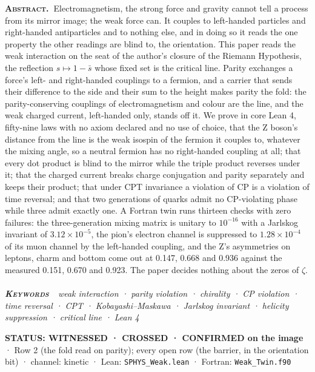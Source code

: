 \documentclass[10pt]{article}
\renewenvironment{quote}{\par\smallskip\noindent\small\color{deep}}{\par\smallskip}
\begin{document}
{\small\noindent\textbf{\scshape\color{deep}Abstract.\ }Electromagnetism,
the strong force and gravity cannot tell a process from its mirror
image; the weak force can. It couples to left-handed particles and
right-handed antiparticles and to nothing else, and in doing so it reads
the one property the other readings are blind to, the orientation. This
paper reads the weak interaction on the seat of the author's closure of
the Riemann Hypothesis, the reflection \(s\mapsto1-\bar s\) whose fixed
set is the critical line. Parity exchanges a force's left- and
right-handed couplings to a fermion, and a carrier that sends their
difference to the side and their sum to the height makes parity the
fold: the parity-conserving couplings of electromagnetism and colour are
the line, and the weak charged current, left-handed only, stands off it.
We prove in core Lean 4, fifty-nine laws with no axiom declared and no
use of choice, that the Z boson's distance from the line is the weak
isospin of the fermion it couples to, whatever the mixing angle, so a
neutral fermion has no right-handed coupling at all; that every dot
product is blind to the mirror while the triple product reverses under
it; that the charged current breaks charge conjugation and parity
separately and keeps their product; that under CPT invariance a
violation of CP is a violation of time reversal; and that two
generations of quarks admit no CP-violating phase while three admit
exactly one. A Fortran twin runs thirteen checks with zero failures: the
three-generation mixing matrix is unitary to \(10^{-16}\) with a
Jarlskog invariant of \(3.12\times10^{-5}\), the pion's electron channel
is suppressed to \(1.28\times10^{-4}\) of its muon channel by the
left-handed coupling, and the Z's asymmetries on leptons, charm and
bottom come out at 0.147, 0.668 and 0.936 against the measured 0.151,
0.670 and 0.923. The paper decides nothing about the zeros of
\(\zeta\).}\\[-2pt]
\noindent{\color{accent}\rule{\textwidth}{0.6pt}}\\[1pt]
{\itshape\footnotesize\color{faint}\noindent\textbf{\upshape\scshape\color{deep}Keywords\ }\ weak
interaction · parity violation · chirality · CP violation · time
reversal · CPT · Kobayashi--Maskawa · Jarlskog invariant · helicity
suppression · critical line · Lean 4}\par\vspace{8pt}
\thispagestyle{fancy}
\begin{quote}
\textbf{STATUS: WITNESSED · CROSSED · CONFIRMED on the image} · Row 2
(the fold read on parity); every open row (the barrier, in the
orientation bit) · channel: kinetic · Lean: \texttt{SPHYS\_Weak.lean} ·
Fortran: \texttt{Weak\_Twin.f90}
\end{quote}
\end{document}
